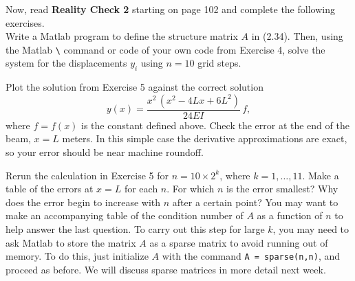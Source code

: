 \documentclass[12pt,fleqn]{exam}
\begin{document}
\begin{questions}
Now, read \textbf{Reality Check 2} starting on page 102 and complete the following exercises.\\[1ex]

\question Write a Matlab program to define the structure matrix $A$ in (2.34). Then, using the Matlab \verb$\$ command or code of your own code from Exercise 4, solve the system for the displacements $y_i$ using $n = 10$ grid steps.

\question Plot the solution from Exercise 5 against the correct solution
\[y(x) = \frac{x^2\,(x^2 - 4 L x + 6 L^2)}{24 E I}\,f,\]
where $f = f(x)$ is the constant defined above. Check the error at the end of the beam, $x = L$ meters. In this simple case the derivative approximations are exact, so your error should be near machine roundoff.

\question Rerun the calculation in Exercise 5 for $n = 10 \times 2^k$, where $k = 1,\dots,11$. Make a table of the errors at $x = L$ for each $n$. For which $n$ is the error smallest? Why does the error begin to increase with $n$ after a certain point? You may want to make an accompanying table of the condition number of $A$ as a function of $n$ to help answer the last question. To carry out this step for large $k$, you may need to ask Matlab to store the matrix $A$ as a sparse matrix to avoid running out of memory. To do this, just initialize $A$ with the command \verb$A = sparse(n,n)$, and proceed as before. We will discuss sparse matrices in more detail next week.

\end{questions}
\end{document}
